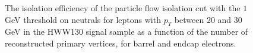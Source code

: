 \begin{figure}[!htbp]
\begin{center}
\caption{The isolation efficiency of the particle flow isolation cut with the $1$GeV threshold on neutrals
for leptons with $p_{T}$ between $20$ and $30$ GeV in the HWW130 signal sample as a function of the 
number of reconstructed primary vertices, for barrel and endcap electrons.}
\label{fig:EleIsoEffVsNVtx_PFIso_Pt20To30}
\end{center}
\end{figure}

